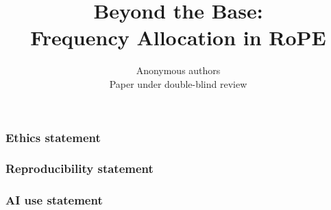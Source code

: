 \documentclass{article}
\title{Beyond the Base:\\ Frequency Allocation in RoPE}
\author{Anonymous authors\\Paper under double-blind review}
\theoremstyle{plain}
\theoremstyle{definition}
\theoremstyle{remark}
\begin{document}
\maketitle

\begin{abstract}

\end{abstract}










\clearpage

\subsubsection*{Ethics statement}


\subsubsection*{Reproducibility statement}


\subsubsection*{AI use statement}


\label{page:statementend}
\clearpage

\label{page:bibstart}



\newpage
\appendix








\end{document}
